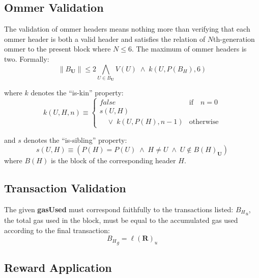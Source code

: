 \documentclass[9pt,oneside]{amsart}
\begin{document}
\begin{multicols}{2}
\subsection{Ommer Validation}

The validation of ommer headers means nothing more than verifying that each ommer header is both a valid header and satisfies the relation of $N$th-generation ommer to the present block where $N \leq 6$. The maximum of ommer headers is two. Formally:
\begin{equation}
\lVert B_\mathbf{U} \rVert \leqslant 2 \bigwedge_{U \in B_\mathbf{U}} V(U) \; \wedge \; k(U, P(B_H), 6)
\end{equation}

where $k$ denotes the ``is-kin'' property:
\begin{equation}
k(U, H, n) \equiv \begin{cases} false & \text{if} \quad n = 0 \\ 
s(U, H) &\\
\quad \vee \; k(U, P(H), n - 1) & \text{otherwise}
\end{cases}
\end{equation}

and $s$ denotes the ``is-sibling'' property:
\begin{equation}
s(U, H) \equiv (P(H) = P(U)\; \wedge \; H \neq U \; \wedge \; U \notin B(H)_\mathbf{U})
\end{equation}
where $B(H)$ is the block of the corresponding header $H$.

\subsection{Transaction Validation}


The given \textbf{gasUsed} must correspond faithfully to the transactions listed: ${B_H}_u$, the total gas used in the block, must be equal to the accumulated gas used according to the final transaction:
\begin{equation}
{B_H}_g = \ell(\mathbf{R})_u
\end{equation}

\subsection{Reward Application}


\end{multicols}
\end{document}
